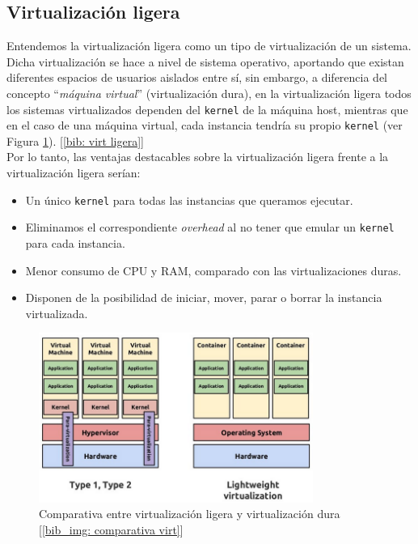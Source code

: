\documentclass[12pt]{article}
\begin{document}
	\pagebreak
	
	\subsection{Virtualización ligera}
	\label{sect: virt ligera}
	
	\noindent Entendemos la virtualización ligera como un tipo de virtualización de un sistema. Dicha virtualización se hace a nivel de sistema operativo, aportando que existan diferentes espacios de usuarios aislados entre sí, sin embargo, a diferencia del concepto ``\textit{máquina virtual}'' (virtualización dura), en la virtualización ligera todos los sistemas virtualizados dependen del \texttt{kernel} de la máquina host, mientras que en el caso de una máquina virtual, cada instancia tendría su propio \texttt{kernel} (ver Figura \ref{img: virtualization comparative}). [\ref{bib: virt ligera}]\\
	
	\noindent Por lo tanto, las ventajas destacables sobre la virtualización ligera frente a la virtualización ligera serían:
	\begin{itemize}
		\item Un único \texttt{kernel} para todas las instancias que queramos ejecutar.
		\item Eliminamos el correspondiente \textit{overhead} al no tener que emular un \texttt{kernel} para cada instancia.
		\item Menor consumo de CPU y RAM, comparado con las virtualizaciones duras.
		\item Disponen de la posibilidad de iniciar, mover, parar o borrar la instancia virtualizada.
	\end{itemize}
	
	\begin{figure}[h!]
		\begin{center}
			\includegraphics[width=0.8\textwidth]{img/virtualization_comparative.png}
			\caption{Comparativa entre virtualización ligera y virtualización dura [\ref{bib_img: comparativa virt}] }
			\label{img: virtualization comparative}
		\end{center}
	\end{figure}
	
\end{document}
